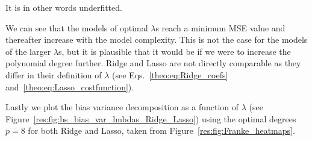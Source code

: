 \documentclass[twocolumn,english,notitlepage]{article}
\begin{document}
            It is in other words underfitted. 

            We can see that the models of optimal $\lambda$s reach a minimum MSE value and thereafter increase with the model complexity. This is not the case for the models of the larger $\lambda$s, but it is plausible that it would be if we were to increase the polynomial degree further. Ridge and Lasso are not directly comparable as they differ in their definition of $\lambda$ (see Eqs.~\eqref{theo:eq:Ridge_coefs} and~\eqref{theo:eq:Lasso_costfunction}).   
            
            Lastly we plot the bias variance decomposition as a function of $\lambda$ (see Figure~\ref{res:fig:bs_bias_var_lmbdas_Ridge_Lasso}) using the optimal degrees $p=8$ for both Ridge and Lasso, taken from Figure~\ref{res:fig:Franke_heatmaps}.  
\end{document}
